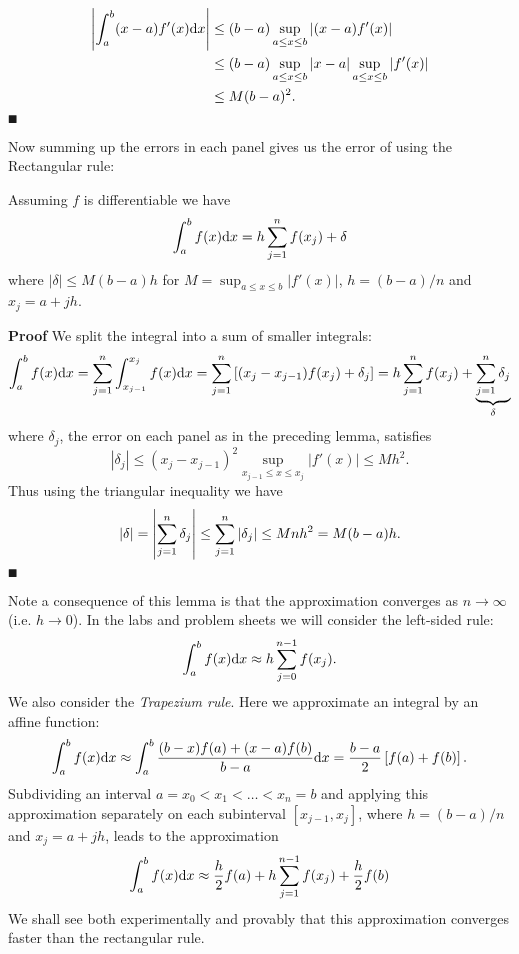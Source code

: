 \begin{align*}
\left|{\int_a^b (x-a) f'(x) {\rm d} x}\right| &\leq (b-a) \sup_{a \leq x \leq b}|(x-a) f'(x)| \\
&\leq (b-a) \sup_{a \leq x \leq b}|x-a| \sup_{a \leq x \leq b}|f'(x)|\\
&\leq M (b-a)^2.
\end{align*}
\ensuremath{\QED}

Now summing up the errors in each panel gives us the error of using the Rectangular rule:

\begin{theorem} Assuming $f$ is differentiable we have
\[
\ensuremath{\int}_a^b f(x) {\rm d}x =  h \ensuremath{\sum}_{j=1}^n f(x_j) +  \ensuremath{\delta}
\]
where $|\ensuremath{\delta}| \ensuremath{\leq} M (b-a) h$ for $M = \sup_{a \ensuremath{\leq} x \ensuremath{\leq} b}|f'(x)|$, $h = (b-a)/n$ and $x_j = a + jh$.

\end{theorem}
\textbf{Proof} We split the integral into a sum of smaller integrals:
\[
\ensuremath{\int}_a^b f(x) {\rm d}x = \ensuremath{\sum}_{j=1}^n  \ensuremath{\int}_{x_{j-1}}^{x_j} f(x) {\rm d}x =
\ensuremath{\sum}_{j=1}^n  \br[(x_j - x_{j-1}) f(x_j) + \ensuremath{\delta}_j] =  h \ensuremath{\sum}_{j=1}^n f(x_j) +  \underbrace{\ensuremath{\sum}_{j=1}^n \ensuremath{\delta}_j}_\ensuremath{\delta}
\]
where $\ensuremath{\delta}_j$, the error on each panel as in the preceding lemma, satisfies
\[
|\ensuremath{\delta}_j| \ensuremath{\leq} (x_j-x_{j-1})^2 \sup_{x_{j-1} \ensuremath{\leq} x \ensuremath{\leq} x_j}|f'(x)| \ensuremath{\leq} M h^2.
\]
Thus using the triangular inequality we have
\[
|\delta| = \left|{ \sum_{j=1}^n \delta_j}\right| \leq \sum_{j=1}^n |\delta_j| \leq M n h^2 = M(b-a)h.
\]
\ensuremath{\QED}

Note a consequence of this lemma is that the approximation converges as $n \ensuremath{\rightarrow} \ensuremath{\infty}$ (i.e. $h \ensuremath{\rightarrow} 0$). In the labs and problem sheets we will consider the left-sided rule:
\[
\ensuremath{\int}_a^b f(x) {\rm d}x \ensuremath{\approx}  h \ensuremath{\sum}_{j=0}^{n-1} f(x_j).
\]
We also consider the \emph{Trapezium rule}. Here we approximate an integral  by an affine function:
\[
\ensuremath{\int}_a^b f(x) {\rm d} x \ensuremath{\approx} \ensuremath{\int}_a^b {(b-x)f(a) + (x-a)f(b) \over b-a} \dx
= {b-a \over 2} \br[f(a) + f(b)].
\]
Subdividing an interval $a = x_0 < x_1 < \ensuremath{\ldots} < x_n = b$ and applying this approximation separately on each subinterval $[x_{j-1},x_j]$, where $h = (b-a)/n$ and $x_j = a + jh$, leads to the approximation
\[
\ensuremath{\int}_a^b f(x) {\rm d}x \ensuremath{\approx}  {h \over 2} f(a) + h \ensuremath{\sum}_{j=1}^{n-1} f(x_j) + {h \over 2} f(b)
\]
We shall see both experimentally and provably that this approximation converges faster than the rectangular rule.



